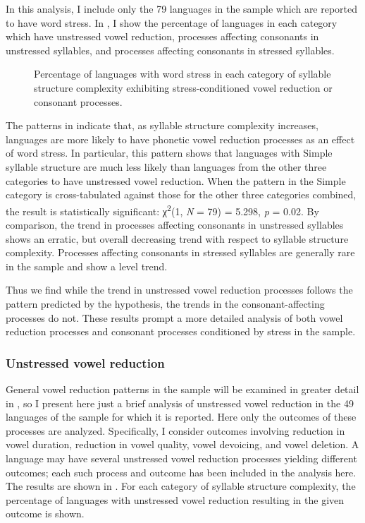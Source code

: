   In this analysis, I include only the 79 languages in the sample which are reported to have word stress. In , I show the percentage of languages in each category which have unstressed vowel reduction, processes affecting consonants in unstressed syllables, and processes affecting consonants in stressed syllables.

\begin{figure}
\caption{\label{fig:5.2} Percentage of languages with word stress in each category of syllable structure complexity exhibiting stress-conditioned vowel reduction or consonant processes.}
\end{figure}

  The patterns in  indicate that, as syllable structure complexity increases, languages are more likely to have phonetic vowel reduction processes as an effect of word stress. In particular, this pattern shows that languages with Simple syllable structure are much less likely than languages from the other three categories to have unstressed vowel reduction. When the pattern in the Simple category is cross-tabulated against those for the other three categories combined, the result is statistically significant: χ\textsuperscript{2}(1, \textit{N} = 79) = 5.298, \textit{p} = 0.02. By comparison, the trend in processes affecting consonants in unstressed syllables shows an erratic, but overall decreasing trend with respect to syllable structure complexity. Processes affecting consonants in stressed syllables are generally rare in the sample and show a level trend. 

  Thus we find while the trend in unstressed vowel reduction processes follows the pattern predicted by the hypothesis, the trends in the consonant-affecting processes do not. These results prompt a more detailed analysis of both vowel reduction processes and consonant processes conditioned by stress in the sample.

\subsubsection{{Unstressed} {vowel} {reduction}}\label{sec:5.4.3.1}

  General vowel reduction patterns in the sample will be examined in greater detail in , so I present here just a brief analysis of unstressed vowel reduction in the 49 languages of the sample for which it is reported. Here only the outcomes of these processes are analyzed. Specifically, I consider outcomes involving reduction in vowel duration, reduction in vowel quality, vowel devoicing, and vowel deletion. A language may have several unstressed vowel reduction processes yielding different outcomes; each such process and outcome has been included in the analysis here. The results are shown in . For each category of syllable structure complexity, the percentage of languages with unstressed vowel reduction resulting in the given outcome is shown.

